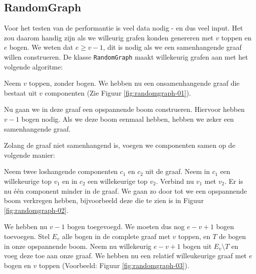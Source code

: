 \documentclass{article}
\begin{document}
\subsection{RandomGraph}
Voor het testen van de performantie is veel data nodig - en dus veel input. Het
zou daarom handig zijn als we willeurig grafen konden genereren met $v$ toppen
en $e$ bogen. We weten dat $e \geq v - 1$, dit is nodig als we een samenhangende
graaf willen construeren.  De klasse \verb#RandomGraph# maakt willekeurig grafen
aan met het volgende algoritme:
\newline

Neem $v$ toppen, zonder bogen. We hebben nu een onsamenhangende graaf die
bestaat uit $v$ componenten (Zie Figuur \ref{fig:randomgraph-01}).
\newline

Nu gaan we in deze graaf een opspannende boom construeren. Hiervoor hebben
$v - 1$ bogen nodig. Als we deze boom eenmaal hebben, hebben we zeker een
samenhangende graaf. 
\newline

Zolang de graaf niet samenhangend is, voegen we componenten samen op de volgende
manier:
\newline

Neem twee loshangende componenten $c_1$ en $c_2$ uit de graaf. Neem in $c_1$ een
willekeurige top $v_1$ en in $c_2$ een willekeurige top $v_2$. Verbind nu $v_1$
met $v_2$. Er is nu \'e\'en component minder in de graaf. We gaan zo door tot
we een opspannende boom verkregen hebben, bijvoorbeeld deze die te zien is in
Figuur \ref{fig:randomgraph-02}.
\newline

We hebben nu $v - 1$ bogen toegevoegd. We moeten dus nog $e - v + 1$ bogen
toevoegen. Stel $E_v$ alle bogen in de complete graaf met $v$ toppen, en $T$ de
bogen in onze opspannende boom. Neem nu willekeurig $e - v + 1$ bogen uit
$E_v \setminus T$ en voeg deze toe aan onze graaf. We hebben nu een relatief
willeukeurige graaf met $e$ bogen en $v$ toppen (Voorbeeld: Figuur
\ref{fig:randomgraph-03}).
\end{document}
